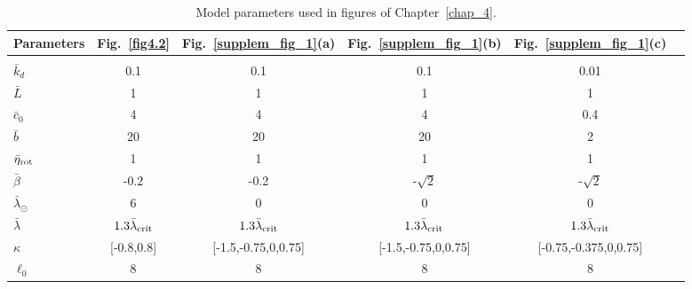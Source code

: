 	\begin{table}[hb]
	\begin{center}\begin{tabular}{l|ccccc} Parameters & Fig.~\ref{fig4.2} & Fig.~\ref{supplem_fig_1}(a) & Fig.~\ref{supplem_fig_1}(b) & Fig.~\ref{supplem_fig_1}(c)     \\ \hline \\
			$\bar{k}_d$  &  0.1& 0.1 &0.1&0.01  \\
			$\bar{L}$  & 1 & 1 &1&1   \\
			$\bar{c}_0$  & 4&  4&4 &0.4 \\
			$\bar{b}$  & 20& 20&20&2\\
			$\bar{\eta}_{\rm rot}$  &  1&  1& 1&1 \\
			$\bar{\beta}$  &  -0.2&  -0.2&-$\sqrt{2}$&-$\sqrt{2}$  \\
			$\bar{\lambda}_\odot$ &  6& 0 &0&0  \\
			$\bar{\lambda}$ &$1.3 \bar{\lambda}_{\rm crit}$  & $1.3 \bar{\lambda}_{\rm crit}$&$1.3 \bar{\lambda}_{\rm crit}$&$1.3 \bar{\lambda}_{\rm crit}$  \\
			$\kappa$ & [-0.8,0.8] & [-1.5,-0.75,0,0.75]&[-1.5,-0.75,0,0.75]&[-0.75,-0.375,0,0.75]  \\
			$\ell_0$ & 8 & 8 &8&8  \\
			\hline
		\end{tabular}
	\end{center}
	\caption{Model parameters used in figures  of Chapter~\ref{chap_4}.}
	\label{defaulttable}
    \end{table}

